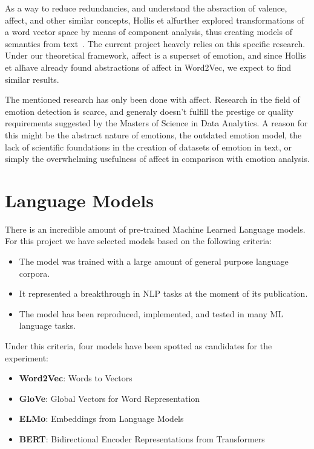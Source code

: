 As a way to reduce redundancies, and understand the absraction of valence, affect, and other similar concepts, Hollis et al\. further explored transformations of a word vector space by means of component analysis, thus creating models of semantics from text~\cite{hollis2016principals}. The current project heavely relies on this specific research. Under our theoretical framework, affect is a superset of emotion, and since Hollis et al\. have already found abstractions of affect in Word2Vec, we expect to find similar results.

The mentioned research has only been done with affect. Research in the field of emotion detection is scarce, and generaly doesn't fulfill the prestige or quality requirements suggested by the Masters of Science in Data Analytics. A reason for this might be the abstract nature of emotions, the outdated emotion model, the lack of scientific foundations in the creation of datasets of emotion in text, or simply the overwhelming usefulness of affect in comparison with emotion analysis.


\section{Language Models}\label{sec:Language Models}
There is an incredible amount of pre-trained Machine Learned Language models. For this project we have selected models based on the following criteria:

\begin{itemize}
  \item The model was trained with a large amount of general purpose language corpora.
  \item It represented a breakthrough in NLP tasks at the moment of its publication.
  \item The model has been reproduced, implemented, and tested in many ML language tasks.
\end{itemize}

Under this criteria, four models have been spotted as candidates for the experiment:
\begin{itemize}
  \item \textbf{Word2Vec}: Words to Vectors
  \item \textbf{GloVe}: Global Vectors for Word Representation
  \item \textbf{ELMo}: Embeddings from Language Models
  \item \textbf{BERT}: Bidirectional Encoder Representations from Transformers
\end{itemize}

